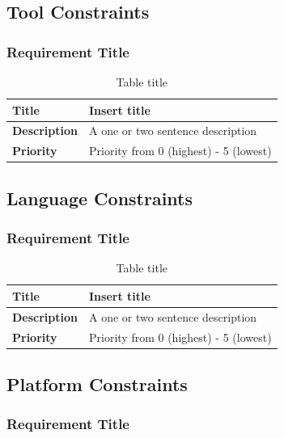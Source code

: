 \documentclass{article}
\begin{document}
\subsection{Tool Constraints}

\subsubsection{Requirement Title}

\begin{table}[H]
\caption{Table title}
\begin{tabularx}{\textwidth}{|l|X|}
    \hline
    \textbf{Title} & Insert title \\ \hline
    \textbf{Description} &  A one or two sentence description \\ \hline 
    \textbf{Priority} &  Priority from 0 (highest) - 5 (lowest) \\ \hline       
\end{tabularx}
\end{table}

\subsection{Language Constraints}

\subsubsection{Requirement Title}

\begin{table}[H]
\caption{Table title}
\begin{tabularx}{\textwidth}{|l|X|}
    \hline
    \textbf{Title} & Insert title \\ \hline
    \textbf{Description} &  A one or two sentence description \\ \hline 
    \textbf{Priority} &  Priority from 0 (highest) - 5 (lowest) \\ \hline       
\end{tabularx}
\end{table}

\subsection{Platform Constraints}

\subsubsection{Requirement Title}
\end{document}
